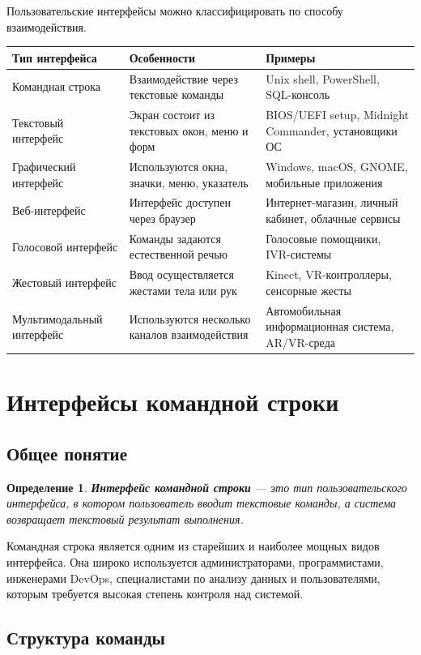 \documentclass[12pt,a4paper]{article}
\newtheorem{definition}{Определение}
\begin{document}
Пользовательские интерфейсы можно классифицировать по способу взаимодействия.

\begin{longtable}{p{4cm}p{5cm}p{5cm}}
\toprule
\textbf{Тип интерфейса} & \textbf{Особенности} & \textbf{Примеры} \\
\midrule
Командная строка & Взаимодействие через текстовые команды & Unix shell, PowerShell, SQL-консоль \\
Текстовый интерфейс & Экран состоит из текстовых окон, меню и форм & BIOS/UEFI setup, Midnight Commander, установщики ОС \\
Графический интерфейс & Используются окна, значки, меню, указатель & Windows, macOS, GNOME, мобильные приложения \\
Веб-интерфейс & Интерфейс доступен через браузер & Интернет-магазин, личный кабинет, облачные сервисы \\
Голосовой интерфейс & Команды задаются естественной речью & Голосовые помощники, IVR-системы \\
Жестовый интерфейс & Ввод осуществляется жестами тела или рук & Kinect, VR-контроллеры, сенсорные жесты \\
Мультимодальный интерфейс & Используются несколько каналов взаимодействия & Автомобильная информационная система, AR/VR-среда \\
\bottomrule
\end{longtable}

\section{Интерфейсы командной строки}

\subsection{Общее понятие}

\begin{definition}
\textbf{Интерфейс командной строки} --- это тип пользовательского интерфейса, в котором пользователь вводит текстовые команды, а система возвращает текстовый результат выполнения.
\end{definition}

Командная строка является одним из старейших и наиболее мощных видов интерфейса. Она широко используется администраторами, программистами, инженерами DevOps, специалистами по анализу данных и пользователями, которым требуется высокая степень контроля над системой.

\subsection{Структура команды}
\end{document}
